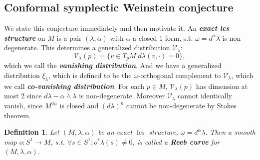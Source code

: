 \documentclass{amsart}
\numberwithin{equation}{section}
\newtheorem{definition}[equation]{Definition}
\theoremstyle{definition}
\theoremstyle{remark}
\DeclareMathOperator{\lcs}{lcs}
\begin{document}
\subsection{Conformal symplectic Weinstein conjecture} \label{sec:highergenus}
We state this conjecture immediately and then motivate it.
An \textbf{\emph{exact lcs structure}} on $M$  is a pair $(\lambda, \alpha)$
with $\alpha$ a closed 1-form, s.t. $\omega=d ^{\alpha} \lambda $ is non-degenerate.
This determines a generalized distribution $\mathcal{V} _{\lambda} $: $$\mathcal{V} _{\lambda} (p) = \{v \in T _{p} {M}| d \lambda (v, \cdot) = 0 \}, %
$$ which we call the \textbf{\emph{vanishing distribution}}. And 
we have a generalized distribution $\xi _{\lambda} $, which is defined to be the $\omega$-orthogonal complement to $\mathcal{V} _{\lambda}$, which we call \textbf{\emph{co-vanishing distribution}}.
For each $p \in M$, $\mathcal{V} _ {\lambda} (p) $  has dimension at most 2 since $d\lambda - \alpha \wedge \lambda$ is non-degenerate. Moreover $\mathcal{V} _{\lambda} $ cannot identically vanish,  since $M ^{2n} $ is closed and $(d\lambda) ^{n}   $ cannot be non-degenerate by Stokes theorem.
\begin{definition} 
Let $(M,\lambda, \alpha)$ be an exact $\lcs$ structure, $\omega= d ^{\alpha} \lambda. $  Then a smooth map $o: S ^{1} \to M$, s.t. $\forall s \in S ^{1}: o ^{*} \lambda (s) \neq 0  $, is
called a \textbf{\emph{Reeb curve}} for $(M,\lambda,\alpha)$. %
\end{definition}
\end{document}
